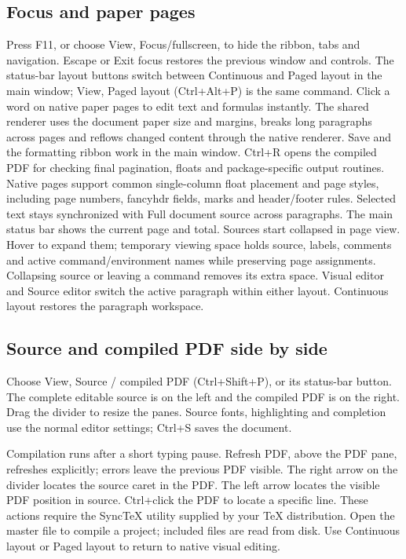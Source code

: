 \documentclass[11pt]{article}
\begin{document}
\subsection{Focus and paper pages}
Press F11, or choose View, Focus/fullscreen, to hide the ribbon, tabs and
navigation. Escape or Exit focus restores the previous window and controls.
The status-bar layout buttons switch between Continuous and Paged layout in the
main window; View, Paged layout (Ctrl+Alt+P) is the same command. Click a word on
native paper pages to edit text and formulas instantly. The shared renderer
uses the document paper size and margins, breaks long paragraphs across pages
and reflows changed content through the native renderer. Save and the
formatting ribbon work in the main window. Ctrl+R opens the compiled PDF for
checking final pagination, floats and package-specific output routines.
Native pages support common single-column float placement and page styles,
including page numbers, fancyhdr fields, marks and header/footer rules.
Selected text stays synchronized with Full document source across paragraphs.
The main status bar shows the current page and total.
Sources start collapsed in page view. Hover to expand them; temporary viewing
space holds source, labels, comments and active command/environment names
while preserving page assignments. Collapsing source or leaving a command
removes its extra space.
Visual editor and Source editor switch the active paragraph within either layout.
Continuous layout restores the paragraph workspace.

\subsection{Source and compiled PDF side by side}
Choose View, Source / compiled PDF (Ctrl+Shift+P), or its status-bar button.
The complete editable source is on the left and the compiled PDF is on the
right. Drag the divider to resize the panes. Source fonts, highlighting and
completion use the normal editor settings; Ctrl+S saves the document.

Compilation runs after a short typing pause. Refresh PDF, above the PDF pane,
refreshes explicitly; errors leave the previous PDF visible. The right arrow
on the divider locates the source caret in the PDF. The left arrow locates the
visible PDF position in source. Ctrl+click the PDF to locate a specific line.
These actions require the SyncTeX utility supplied by your \TeX{} distribution.
Open the master file to compile a project; included files are read from disk.
Use Continuous layout or Paged layout to return to native visual editing.
\end{document}
